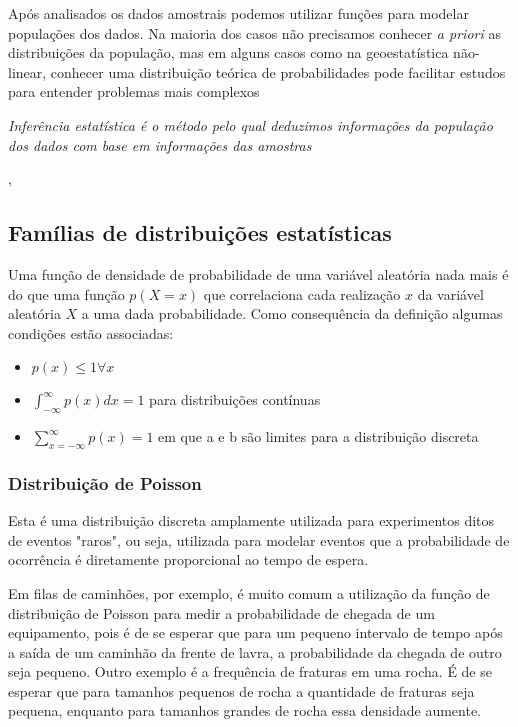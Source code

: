 Após analisados os dados amostrais podemos utilizar funções para modelar populações dos dados. Na maioria dos casos não precisamos conhecer \textit{a priori} as distribuições da população, mas em alguns casos como na geoestatística não-linear, conhecer uma distribuição teórica de probabilidades pode facilitar estudos para entender problemas mais complexos

\begin{definition}
	\textit{Inferência estatística é o método pelo qual deduzimos informações da população dos dados com base em informações das amostras}
\end{definition}
	
,
\subsection{Famílias de distribuições estatísticas}

Uma função de densidade de probabilidade de uma variável aleatória nada mais é do que uma função $p(X = x)$ que correlaciona cada realização $x$ da variável aleatória $X$ a uma dada probabilidade. Como consequência da definição algumas condições estão associadas:

\begin{itemize}
	\item $p(x) \leq 1 \forall x$
	\item $\int_{-\infty}^{\infty} p(x) dx = 1$ para distribuições contínuas
	\item $\sum_{x=-\infty}^{\infty} p(x) = 1$ em que a e b são limites para a distribuição discreta
\end{itemize}
 

\subsubsection{Distribuição de Poisson}

Esta é uma distribuição discreta amplamente utilizada para experimentos ditos de eventos "raros", ou seja, utilizada para modelar eventos que a probabilidade de ocorrência é diretamente proporcional ao tempo de espera. 

Em filas de caminhões, por exemplo, é muito comum a utilização da função de distribuição de Poisson para medir a probabilidade de chegada de um equipamento, pois é de se esperar que para um pequeno intervalo de tempo após a saída de um caminhão da frente de lavra, a probabilidade da chegada de outro  seja pequeno. Outro exemplo é a frequência de fraturas em uma rocha. É de se esperar que para tamanhos pequenos de rocha a quantidade de fraturas seja pequena, enquanto para tamanhos grandes de rocha essa densidade aumente.

